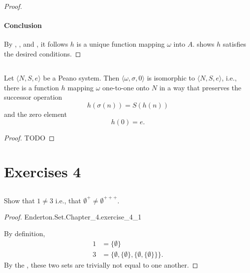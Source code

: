 \documentclass{report}
\begin{document}
\begin{proof}
  \paragraph{Conclusion}%

    By ,
      , and
      , it follows $h$ is a
      unique function mapping $\omega$ into $A$.
     shows $h$ satisfies the
      desired conditions.

\end{proof}

\subsection{}%

\begin{theorem}[4H]

  Let $\langle N, S, e \rangle$ be a Peano system.
  Then $\langle \omega, \sigma, 0 \rangle$ is isomorphic to
    $\langle N, S, e \rangle$, i.e., there is a function $h$ mapping $\omega$
    one-to-one onto $N$ in a way that preserves the successor operation
    $$h(\sigma(n)) = S(h(n))$$ and the zero element $$h(0) = e.$$

\end{theorem}

\begin{proof}

  TODO

\end{proof}

\section{Exercises 4}%

\subsection{}%

Show that $1 \neq 3$ i.e., that $\emptyset^+ \neq \emptyset^{+++}$.

\begin{proof}

    {Enderton.Set.Chapter\_4.exercise\_4\_1}

  By definition,
    \begin{align*}
      1 & = \{\emptyset\} \\
      3 & = \{\emptyset, \{\emptyset\}, \{\emptyset, \{\emptyset\}\}\}.
    \end{align*}
  By the , these two sets are trivially not
    equal to one another.

\end{proof}
\end{document}
